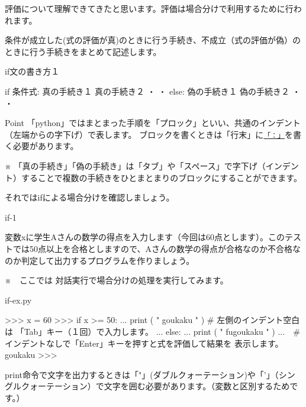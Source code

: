 \documentclass[11pt,a4paper,dvipdfmx,titlepage]{jsreport}
\begin{document}
評価について理解できてきたと思います。評価は場合分けで利用するために行われます。

条件が成立した(式の評価が真)のときに行う手続き、不成立（式の評価が偽）のときに行う手続きをまとめて記述します。


\begin{grabox}{if文の書き方１}
\begin{listing}{1}
if 条件式:
    真の手続き１
    真の手続き２
    ・
    ・
else:
    偽の手続き１
    偽の手続き２
    ・
    ・
\end{listing}
\end{grabox}
\begin{hipoint}{Point}
「python」ではまとまった手順を「プロック」といい、共通のインデント（左端からの字下げ）で表します。
ブロックを書くときは「行末」に{\underline{\tt 「：」}}を書く必要があります。

※ 「真の手続き」「偽の手続き」は「タブ」や「スペース」で字下げ（インデント）することで複数の手続きをひとまとまりのブロックにすることができます。
\end{hipoint}

それではifによる場合分けを確認しましょう。

\begin{pabox}{if-1}

変数xに学生Aさんの数学の得点を入力します（今回は60点とします）。このテストでは50点以上を合格としますので、Aさんの数学の得点が合格なのか不合格なのか判定して出力するプログラムを作りましょう。

※　ここでは {\gt 対話実行}で場合分けの処理を実行してみます。

\begin{legbox}{if-ex.py}
\begin{listing}{1}
>>> x = 60
>>> if x >= 50:
...      print ( " goukaku " ) # 左側のインデント空白は
                                 「Tab」キー（１回）で入力します。
... else:
...      print ( " fugoukaku " )
...　#インデントなしで「Enter」キーを押すと式を評価して結果を
     表示します。
goukaku
>>>
\end{listing}
\end{legbox}


\begin{description}
 \item print命令で文字を出力するときは「"」(ダブルクォーテーション)や「'」（シングルクォーテーション）で文字を囲む必要があります。（変数と区別するためです。）
\end{description}
\end{pabox}
\end{document}
